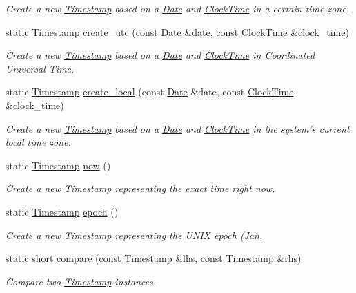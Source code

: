 \begin{DoxyCompactItemize}
\begin{DoxyCompactList}\small\item\em Create a new \hyperlink{structTimestamp}{Timestamp} based on a \hyperlink{structDate}{Date} and \hyperlink{structClockTime}{Clock\-Time} in a certain time zone. \end{DoxyCompactList}\item 
static \hyperlink{structTimestamp}{Timestamp} \hyperlink{structTimestamp_a055a8725134dace86cf5a017469f5def}{create\-\_\-utc} (const \hyperlink{structDate}{Date} \&date, const \hyperlink{structClockTime}{Clock\-Time} \&clock\-\_\-time)
\begin{DoxyCompactList}\small\item\em Create a new \hyperlink{structTimestamp}{Timestamp} based on a \hyperlink{structDate}{Date} and \hyperlink{structClockTime}{Clock\-Time} in Coordinated Universal Time. \end{DoxyCompactList}\item 
static \hyperlink{structTimestamp}{Timestamp} \hyperlink{structTimestamp_a7601075ef85b132115e733cddc747675}{create\-\_\-local} (const \hyperlink{structDate}{Date} \&date, const \hyperlink{structClockTime}{Clock\-Time} \&clock\-\_\-time)
\begin{DoxyCompactList}\small\item\em Create a new \hyperlink{structTimestamp}{Timestamp} based on a \hyperlink{structDate}{Date} and \hyperlink{structClockTime}{Clock\-Time} in the system's current local time zone. \end{DoxyCompactList}\item 
static \hyperlink{structTimestamp}{Timestamp} \hyperlink{structTimestamp_ab2b17140c0c966ad672395f3f90b8653}{now} ()
\begin{DoxyCompactList}\small\item\em Create a new \hyperlink{structTimestamp}{Timestamp} representing the exact time right now. \end{DoxyCompactList}\item 
static \hyperlink{structTimestamp}{Timestamp} \hyperlink{structTimestamp_aa2f108710dbe1372d8fc7146a2e66c37}{epoch} ()
\begin{DoxyCompactList}\small\item\em Create a new \hyperlink{structTimestamp}{Timestamp} representing the U\-N\-I\-X epoch (Jan. \end{DoxyCompactList}\item 
static short \hyperlink{structTimestamp_a2099bdddf963c9ab1ccf2d0845100cc7}{compare} (const \hyperlink{structTimestamp}{Timestamp} \&lhs, const \hyperlink{structTimestamp}{Timestamp} \&rhs)
\begin{DoxyCompactList}\small\item\em Compare two \hyperlink{structTimestamp}{Timestamp} instances. \end{DoxyCompactList}\end{DoxyCompactItemize}
